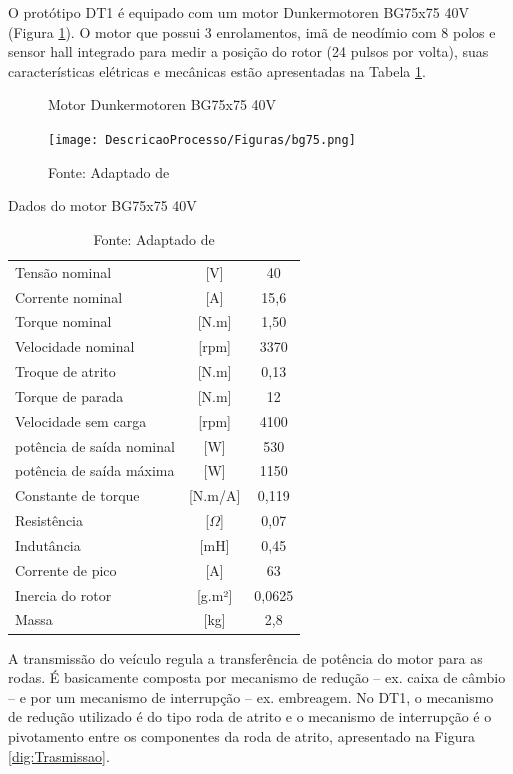 O protótipo DT1 é equipado com um motor Dunkermotoren BG75x75 40V (Figura \ref{fig:motor_bg75}). O motor que possui 3 enrolamentos, imã de neodímio
com 8 polos e sensor hall integrado para medir a posição do rotor (24 pulsos por volta), suas características elétricas e mecânicas estão
apresentadas na Tabela \ref{tab:dadosBg75}.

\begin{figure}[h]
	\centering
	\caption{Motor Dunkermotoren BG75x75 40V}
	\label{fig:motor_bg75}
	\texttt{[image: DescricaoProcesso/Figuras/bg75.png]}
	\caption*{\footnotesize Fonte: Adaptado de }
\end{figure}

\begin{table}[H]
	\centering
	\caption{Dados do motor BG75x75 40V}
	\label{tab:dadosBg75}
	\begin{tabular}{lcc}
		\toprule
		Tensão nominal            & {[}V{]}        & 40     \\
		Corrente nominal          & {[}A{]}        & 15,6   \\
		Torque nominal            & {[}N.m{]}      & 1,50    \\
		Velocidade nominal        & {[}rpm{]}      & 3370   \\
		Troque de atrito          & {[}N.m{]}      & 0,13   \\
		Torque de parada          & {[}N.m{]}      & 12     \\
		Velocidade sem carga      & {[}rpm{]}      & 4100   \\
		potência de saída nominal & {[}W{]}        & 530    \\
		potência de saída máxima  & {[}W{]}        & 1150   \\
		Constante de torque       & {[}N.m/A{]}    & 0,119  \\
		Resistência               & {[}$\Omega${]} & 0,07   \\
		Indutância                & {[}mH{]}       & 0,45   \\
		Corrente de pico          & {[}A{]}        & 63     \\
		Inercia do rotor          & {[}g.m²{]}     & 0,0625 \\
		Massa                     & {[}kg{]}       & 2,8    \\
		\bottomrule
	\end{tabular}
	\caption*{\footnotesize Fonte: Adaptado de }
\end{table}

A transmissão do veículo regula a transferência de potência do motor para as rodas. É basicamente composta por mecanismo de
redução -- ex. caixa de câmbio -- e por um mecanismo de interrupção -- ex. embreagem\cite{book:Modern_Electric_Vehicles}.
No DT1, o mecanismo de redução utilizado é do tipo roda de atrito e o mecanismo de interrupção é o pivotamento entre os componentes da roda de atrito, apresentado na Figura \ref{dig:Trasmissao}.

